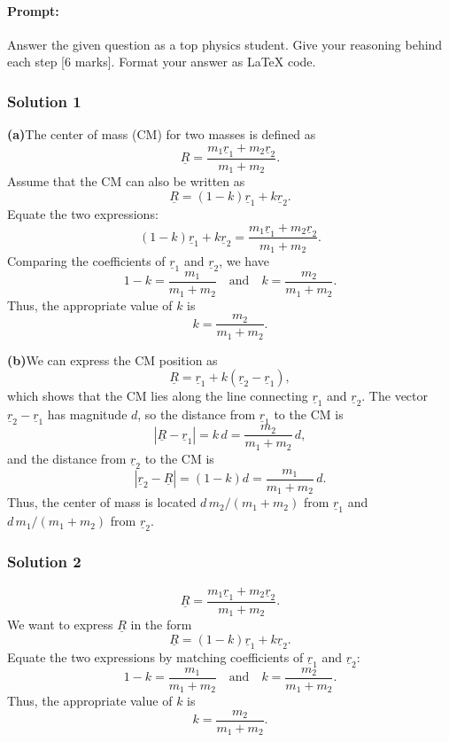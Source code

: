 \documentclass{article}
\begin{document}
\paragraph{Prompt: \\} 
Answer the given question as a top physics student. Give your reasoning behind each step [6 marks].
Format your answer as LaTeX code.

\subsubsection{Solution 1}
\textbf{(a)}\quad The center of mass (CM) for two masses is defined as
\[
\underline{R} = \frac{m_1\underline{r}_1 + m_2\underline{r}_2}{m_1+m_2}.
\]
Assume that the CM can also be written as
\[
\underline{R} = (1-k)\underline{r}_1 + k\underline{r}_2.
\]
Equate the two expressions:
\[
(1-k)\underline{r}_1 + k\underline{r}_2 = \frac{m_1\underline{r}_1 + m_2\underline{r}_2}{m_1+m_2}.
\]
Comparing the coefficients of \(\underline{r}_1\) and \(\underline{r}_2\), we have
\[
1-k = \frac{m_1}{m_1+m_2} \quad \text{and} \quad k = \frac{m_2}{m_1+m_2}.
\]
Thus, the appropriate value of \(k\) is
\[
k = \frac{m_2}{m_1+m_2}.
\]

\textbf{(b)}\quad We can express the CM position as
\[
\underline{R} = \underline{r}_1 + k(\underline{r}_2-\underline{r}_1),
\]
which shows that the CM lies along the line connecting \(\underline{r}_1\) and \(\underline{r}_2\). The vector \(\underline{r}_2 - \underline{r}_1\) has magnitude \(d\), so the distance from \(\underline{r}_1\) to the CM is
\[
|\underline{R}-\underline{r}_1| = k\,d = \frac{m_2}{m_1+m_2}\,d,
\]
and the distance from \(\underline{r}_2\) to the CM is
\[
|\underline{r}_2-\underline{R}| = (1-k)d = \frac{m_1}{m_1+m_2}\,d.
\]
Thus, the center of mass is located \(d\,m_2/(m_1+m_2)\) from \(\underline{r}_1\) and \(d\,m_1/(m_1+m_2)\) from \(\underline{r}_2\).

\subsubsection{Solution 2}
\[
\underline{R} = \frac{m_1 \underline{r}_1 + m_2 \underline{r}_2}{m_1+m_2}.
\]
We want to express \(\underline{R}\) in the form
\[
\underline{R} = (1-k)\underline{r}_1 + k\underline{r}_2.
\]
Equate the two expressions by matching coefficients of \(\underline{r}_1\) and \(\underline{r}_2\):
\[
1-k = \frac{m_1}{m_1+m_2} \quad \text{and} \quad k = \frac{m_2}{m_1+m_2}.
\]
Thus, the appropriate value of \(k\) is 
\[
k = \frac{m_2}{m_1+m_2}.
\]
\end{document}
